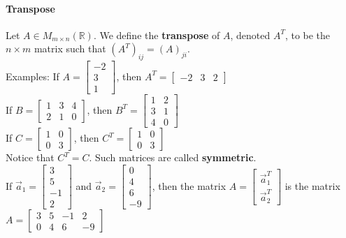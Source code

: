 \documentclass[10pt,letter]{article}
\begin{document}
\paragraph{Transpose} Let $A\in M_{m\times n}(\mathbb{R})$. We define the \textbf{transpose} of $A$, denoted $A^T$, to be the $n\times m$ matrix such that $(A^T)_{ij}=(A)_{ji}$. \\
Examples: If $A = \begin{bmatrix}-2\\3\\1\end{bmatrix}$, then $A^T=\begin{bmatrix}-2&3&2\end{bmatrix}$ \\ 
If $B = \begin{bmatrix}1&3&4\\2&1&0\end{bmatrix}$, then $B^T=\begin{bmatrix}1&2\\3&1\\4&0\end{bmatrix}$ \\ 
If $C = \begin{bmatrix}1&0\\0&3\end{bmatrix}$, then $C^T=\begin{bmatrix}1&0\\0&3\end{bmatrix}$\\ 
Notice that $C^T=C$. Such matrices are called \textbf{symmetric}. \\ 
If $\vec{a}_1=\begin{bmatrix}3\\5\\-1\\2\end{bmatrix}$ and $\vec{a}_2=\begin{bmatrix}0\\4\\6\\-9\end{bmatrix}$, then the matrix $A=\begin{bmatrix}\vec{a}_1^T\\\vec{a}_2^T\end{bmatrix}$ is the matrix $A=\begin{bmatrix}3&5&-1&2\\0&4&6&-9\end{bmatrix}$ \\ 
\end{document}
